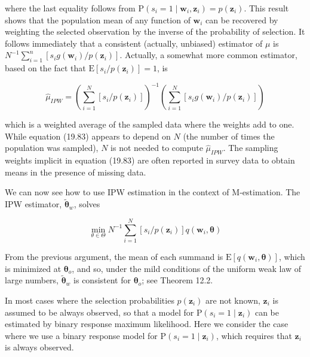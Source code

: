 \documentclass[10pt]{article}
\begin{document}
where the last equality follows from $\mathrm{P}\left(s_{i}=1 \mid \mathbf{w}_{i}, \mathbf{z}_{i}\right)=p\left(\mathbf{z}_{i}\right)$. This result shows that the population mean of any function of $\mathbf{w}_{i}$ can be recovered by weighting the selected observation by the inverse of the probability of selection. It follows immediately that a consistent (actually, unbiased) estimator of $\mu$ is $N^{-1} \sum_{i=1}^{n}\left[s_{i} g\left(\mathbf{w}_{i}\right) / p\left(\mathbf{z}_{i}\right)\right]$. Actually, a somewhat more common estimator, based on the fact that $\mathrm{E}\left[s_{i} / p\left(\mathbf{z}_{i}\right)\right]=1$, is


\begin{equation*}
\hat{\mu}_{I P W}=\left(\sum_{i=1}^{N}\left[s_{i} / p\left(\mathbf{z}_{i}\right)\right]\right)^{-1}\left(\sum_{i=1}^{N}\left[s_{i} g\left(\mathbf{w}_{i}\right) / p\left(\mathbf{z}_{i}\right)\right]\right) \tag{19.83}
\end{equation*}


which is a weighted average of the sampled data where the weights add to one. While equation (19.83) appears to depend on $N$ (the number of times the population was sampled), $N$ is not needed to compute $\hat{\mu}_{I P W}$. The sampling weights implicit in equation (19.83) are often reported in survey data to obtain means in the presence of missing data.

We can now see how to use IPW estimation in the context of M-estimation. The IPW estimator, $\tilde{\boldsymbol{\theta}}_{w}$, solves


\begin{equation*}
\min _{\theta \in \Theta} N^{-1} \sum_{i=1}^{N}\left[s_{i} / p\left(\mathbf{z}_{i}\right)\right] q\left(\mathbf{w}_{i}, \boldsymbol{\theta}\right) \tag{19.84}
\end{equation*}


From the previous argument, the mean of each summand is $\mathrm{E}\left[q\left(\mathbf{w}_{i}, \boldsymbol{\theta}\right)\right]$, which is minimized at $\boldsymbol{\theta}_{o}$, and so, under the mild conditions of the uniform weak law of large numbers, $\tilde{\boldsymbol{\theta}}_{w}$ is consistent for $\boldsymbol{\theta}_{o}$; see Theorem 12.2.

In most cases where the selection probabilities $p\left(\mathbf{z}_{i}\right)$ are not known, $\mathbf{z}_{i}$ is assumed to be always observed, so that a model for $\mathrm{P}\left(s_{i}=1 \mid \mathbf{z}_{i}\right)$ can be estimated by binary response maximum likelihood. Here we consider the case where we use a binary response model for $\mathrm{P}\left(s_{i}=1 \mid \mathbf{z}_{i}\right)$, which requires that $\mathbf{z}_{i}$ is always observed.
\end{document}
